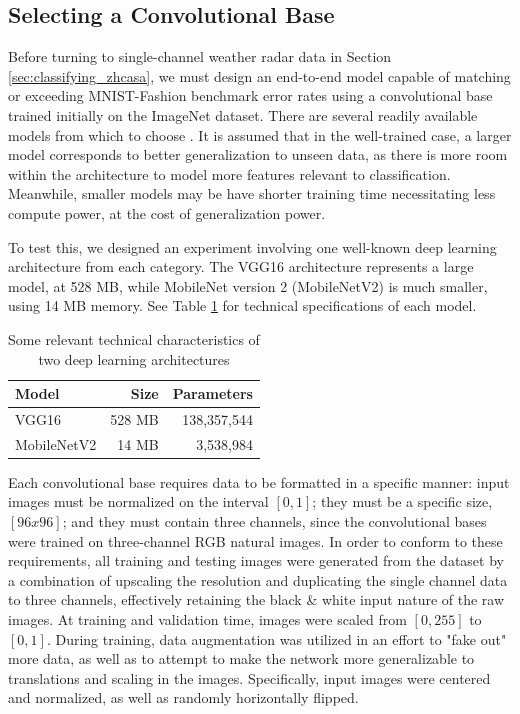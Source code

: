 \subsection{Selecting a Convolutional Base}
\label{ssec:classifying_selectingbase}
Before turning to single-channel weather radar data in Section \ref{sec:classifying_zhcasa}, we must design an end-to-end model capable of matching or exceeding MNIST-Fashion benchmark error rates using a convolutional base trained initially on the ImageNet dataset.
There are several readily available models from which to choose \cite{chollet2015keras}.
It is assumed that in the well-trained case, a larger model corresponds to better generalization to unseen data, as there is more room within the architecture to model more features relevant to classification.
Meanwhile, smaller models may be have shorter training time necessitating less compute power, at the cost of generalization power.

To test this, we designed an experiment involving one well-known deep learning architecture from each category.
The VGG16 \cite{simonyan2014very} architecture represents a large model, at 528 MB, while MobileNet version 2 (MobileNetV2) \cite{sandler2018mobilenetv2} is much smaller, using 14 MB memory.
See Table \ref{table:classifying_conv_bases} for technical specifications of each model.

\begin{table}
\begin{tabular}{l r r}
	Model & Size & Parameters \\
	\hline
	VGG16 & 528 MB & 138,357,544 \\
	MobileNetV2 & 14 MB & 3,538,984 \\
\end{tabular}
\caption{Some relevant technical characteristics of two deep learning architectures}
\label{table:classifying_conv_bases}
\end{table}

Each convolutional base requires data to be formatted in a specific manner: input images must be normalized on the interval $[0,1]$; they must be a specific size, $[96 x 96]$; and they must contain three channels, since the convolutional bases were trained on three-channel RGB natural images.
In order to conform to these requirements, all training and testing images were generated from the dataset by a combination of upscaling the resolution and duplicating the single channel data to three channels, effectively retaining the black \& white input nature of the raw images.
At training and validation time, images were scaled from $[0,255]$ to $[0,1]$.
During training, data augmentation was utilized in an effort to "fake out" more data, as well as to attempt to make the network more generalizable to translations and scaling in the images.
Specifically, input images were centered and normalized, as well as randomly horizontally flipped.

